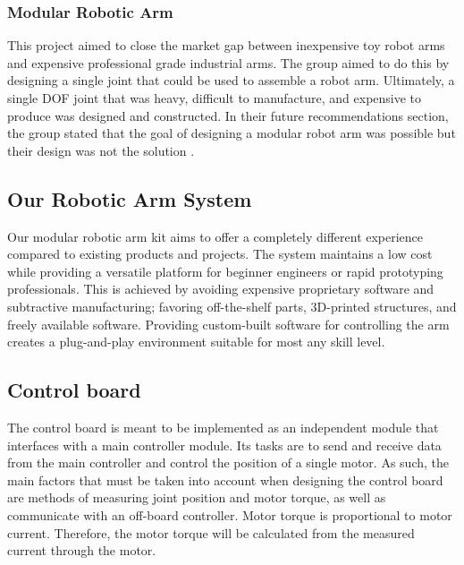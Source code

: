 \subsubsection{Modular Robotic Arm}
This project aimed to close the market gap between inexpensive toy robot arms and expensive professional grade industrial arms. The group aimed to do this by designing a single joint that could be used to assemble a robot arm. Ultimately, a single DOF joint that was heavy, difficult to manufacture, and expensive to produce was designed and constructed. In their future recommendations section, the group stated that the goal of designing a modular robot arm was possible but their design was not the solution \cite{MRA}.

\subsection{Our Robotic Arm System}
Our modular robotic arm kit aims to offer a completely different experience compared to existing products and projects. The system maintains a low cost while providing a versatile platform for beginner engineers or rapid prototyping professionals. This is achieved by avoiding expensive proprietary software and subtractive manufacturing; favoring off-the-shelf parts, 3D-printed structures, and freely available software. Providing custom-built software for controlling the arm creates a plug-and-play environment suitable for most any skill level.


\subsection{Control board}
The control board is meant to be implemented as an independent module that interfaces with a main controller module. Its tasks are to send and receive data from the main controller and control the position of a single motor. As such, the main factors that must be taken into account when designing the control board are methods of measuring joint position and motor torque, as well as communicate with an off-board controller. Motor torque is proportional to motor current. Therefore, the motor torque will be calculated from the measured current through the motor.
